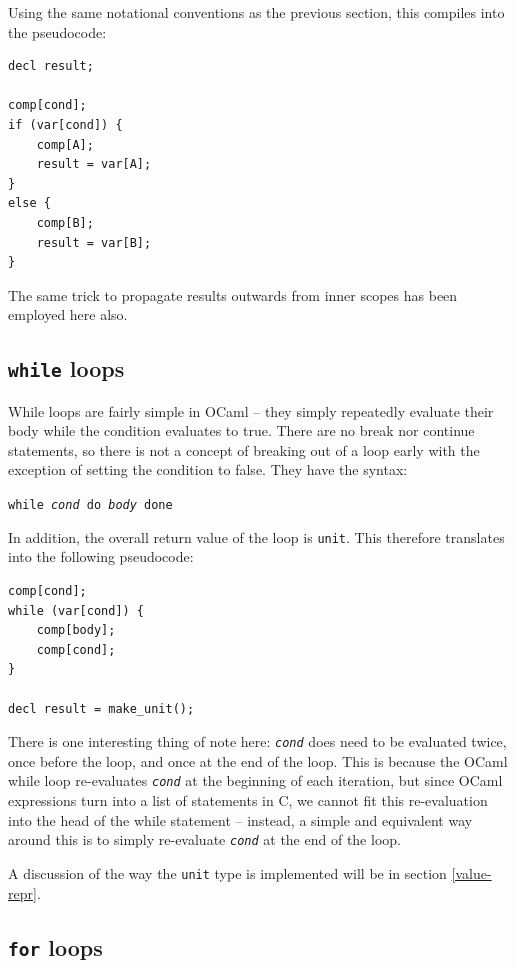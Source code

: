 \documentclass[12pt,a4paper,twoside,openright]{report}
\begin{document}
Using the same notational conventions as the previous section, this compiles 
into the pseudocode:

\begin{lstlisting}
decl result;

comp[cond];
if (var[cond]) {
    comp[A];
    result = var[A];
}
else {
    comp[B];
    result = var[B];
}
\end{lstlisting}

The same trick to propagate results outwards from inner scopes has been 
employed here also.

\subsection{\texttt{while} loops}

While loops are fairly simple in OCaml -- they simply repeatedly evaluate their 
body while the condition evaluates to true. There are no break nor continue 
statements, so there is not a concept of breaking out of a loop early with the 
exception of setting the condition to false. They have the syntax:

\begin{center}
    \texttt{while \emph{cond} do \emph{body} done}
\end{center}

In addition, the overall return value of the loop is \texttt{unit}. This 
therefore translates into the following pseudocode:

\begin{lstlisting}
comp[cond];
while (var[cond]) {
    comp[body];
    comp[cond];
}

decl result = make_unit();
\end{lstlisting}

There is one interesting thing of note here: \texttt{\emph{cond}} does need to 
be evaluated twice, once before the loop, and once at the end of the loop. This 
is because the OCaml while loop re-evaluates \texttt{\emph{cond}} at the 
beginning of each iteration, but since OCaml expressions turn into a list of 
statements in C, we cannot fit this re-evaluation into the head of the while 
statement -- instead, a simple and equivalent way around this is to simply 
re-evaluate \texttt{\emph{cond}} at the end of the loop.

A discussion of the way the \texttt{unit} type is implemented will be in 
section \ref{value-repr}.

\subsection{\texttt{for} loops}
\end{document}
